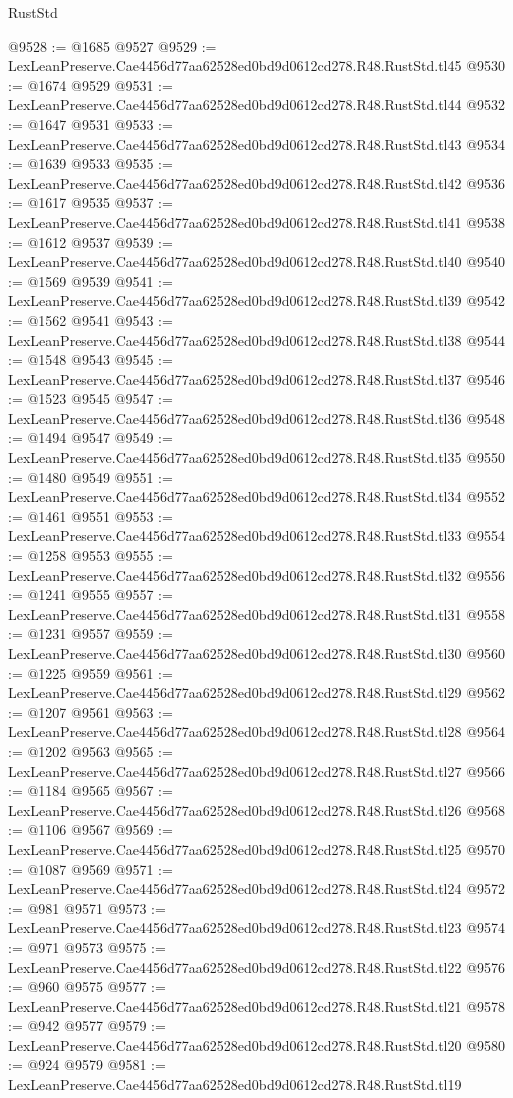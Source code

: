 \begin{lexlean}{RustStd}
\begin{coremodule}
@9528 := @1685 @9527
@9529 := LexLeanPreserve.Cae4456d77aa62528ed0bd9d0612cd278.R48.RustStd.tl45
@9530 := @1674 @9529
@9531 := LexLeanPreserve.Cae4456d77aa62528ed0bd9d0612cd278.R48.RustStd.tl44
@9532 := @1647 @9531
@9533 := LexLeanPreserve.Cae4456d77aa62528ed0bd9d0612cd278.R48.RustStd.tl43
@9534 := @1639 @9533
@9535 := LexLeanPreserve.Cae4456d77aa62528ed0bd9d0612cd278.R48.RustStd.tl42
@9536 := @1617 @9535
@9537 := LexLeanPreserve.Cae4456d77aa62528ed0bd9d0612cd278.R48.RustStd.tl41
@9538 := @1612 @9537
@9539 := LexLeanPreserve.Cae4456d77aa62528ed0bd9d0612cd278.R48.RustStd.tl40
@9540 := @1569 @9539
@9541 := LexLeanPreserve.Cae4456d77aa62528ed0bd9d0612cd278.R48.RustStd.tl39
@9542 := @1562 @9541
@9543 := LexLeanPreserve.Cae4456d77aa62528ed0bd9d0612cd278.R48.RustStd.tl38
@9544 := @1548 @9543
@9545 := LexLeanPreserve.Cae4456d77aa62528ed0bd9d0612cd278.R48.RustStd.tl37
@9546 := @1523 @9545
@9547 := LexLeanPreserve.Cae4456d77aa62528ed0bd9d0612cd278.R48.RustStd.tl36
@9548 := @1494 @9547
@9549 := LexLeanPreserve.Cae4456d77aa62528ed0bd9d0612cd278.R48.RustStd.tl35
@9550 := @1480 @9549
@9551 := LexLeanPreserve.Cae4456d77aa62528ed0bd9d0612cd278.R48.RustStd.tl34
@9552 := @1461 @9551
@9553 := LexLeanPreserve.Cae4456d77aa62528ed0bd9d0612cd278.R48.RustStd.tl33
@9554 := @1258 @9553
@9555 := LexLeanPreserve.Cae4456d77aa62528ed0bd9d0612cd278.R48.RustStd.tl32
@9556 := @1241 @9555
@9557 := LexLeanPreserve.Cae4456d77aa62528ed0bd9d0612cd278.R48.RustStd.tl31
@9558 := @1231 @9557
@9559 := LexLeanPreserve.Cae4456d77aa62528ed0bd9d0612cd278.R48.RustStd.tl30
@9560 := @1225 @9559
@9561 := LexLeanPreserve.Cae4456d77aa62528ed0bd9d0612cd278.R48.RustStd.tl29
@9562 := @1207 @9561
@9563 := LexLeanPreserve.Cae4456d77aa62528ed0bd9d0612cd278.R48.RustStd.tl28
@9564 := @1202 @9563
@9565 := LexLeanPreserve.Cae4456d77aa62528ed0bd9d0612cd278.R48.RustStd.tl27
@9566 := @1184 @9565
@9567 := LexLeanPreserve.Cae4456d77aa62528ed0bd9d0612cd278.R48.RustStd.tl26
@9568 := @1106 @9567
@9569 := LexLeanPreserve.Cae4456d77aa62528ed0bd9d0612cd278.R48.RustStd.tl25
@9570 := @1087 @9569
@9571 := LexLeanPreserve.Cae4456d77aa62528ed0bd9d0612cd278.R48.RustStd.tl24
@9572 := @981 @9571
@9573 := LexLeanPreserve.Cae4456d77aa62528ed0bd9d0612cd278.R48.RustStd.tl23
@9574 := @971 @9573
@9575 := LexLeanPreserve.Cae4456d77aa62528ed0bd9d0612cd278.R48.RustStd.tl22
@9576 := @960 @9575
@9577 := LexLeanPreserve.Cae4456d77aa62528ed0bd9d0612cd278.R48.RustStd.tl21
@9578 := @942 @9577
@9579 := LexLeanPreserve.Cae4456d77aa62528ed0bd9d0612cd278.R48.RustStd.tl20
@9580 := @924 @9579
@9581 := LexLeanPreserve.Cae4456d77aa62528ed0bd9d0612cd278.R48.RustStd.tl19

\end{coremodule}
\end{lexlean}

